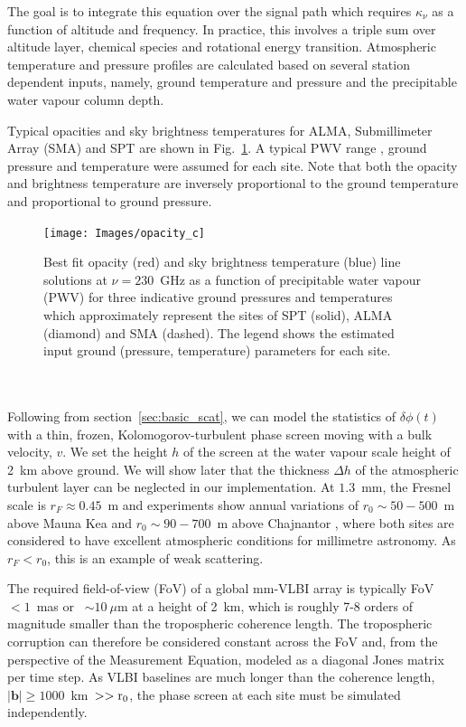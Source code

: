The goal is to integrate this equation over the signal path which requires $\kappa_\nu$ as a function of altitude and frequency. In practice, this involves a triple sum over altitude layer, chemical species and rotational energy transition. Atmospheric temperature and pressure profiles are calculated based on several station dependent inputs, namely, ground temperature and pressure and the precipitable water vapour column depth.

Typical opacities and sky brightness temperatures for ALMA, Submillimeter Array (SMA) and SPT  are shown in Fig.~\ref{fig:mean_atm}. A typical PWV range \cite{Lane_1998}, ground pressure and temperature were assumed for each site. Note that both the opacity and brightness temperature are inversely proportional to the ground temperature and proportional to ground pressure.

\begin{figure}
\begin{center}
\texttt{[image: Images/opacity\_c]}
\caption{Best fit opacity (red) and sky brightness temperature (blue) line solutions at $\nu =230$~GHz as a function of precipitable water vapour (PWV) for three indicative ground pressures and temperatures which approximately represent the sites of SPT (solid), ALMA (diamond) and SMA (dashed). The legend shows the estimated input ground (pressure, temperature) parameters for each site.\label{fig:mean_atm}%
}
\end{center}
\end{figure}
\\
~\\


Following from section~\ref{sec:basic_scat}, we can model the statistics of $\delta \phi(t)$ with a thin, frozen, Kolomogorov-turbulent phase screen moving with a bulk velocity, $v$.  We set the height $h$ of the screen at the water vapour scale height of 2~km above ground. We will show later that the thickness $\Delta h$ of the atmospheric turbulent layer can be neglected in our implementation. At $1.3$~mm, the Fresnel scale is $r_F \approx 0.45$~m and experiments show annual variations of $r_0 \sim 50 - 500$~m above Mauna Kea \citep{Masson_1994} and $r_0 \sim 90 - 700$~m above Chajnantor \citep*{Radford_1998}, where both sites are considered to have excellent atmospheric conditions for millimetre astronomy. As $r_F < r_0$, this is an example of weak scattering. 


The required field-of-view (FoV) of a global mm-VLBI array is typically FoV~$< 1$~mas or ~$\sim10~\mu$m at a height of 2~km, which is roughly 7-8 orders of magnitude smaller than the tropospheric coherence length. The tropospheric corruption can therefore be considered constant across the FoV and, from the perspective of the Measurement Equation, modeled as a diagonal Jones matrix per time step. As VLBI baselines are much longer than the coherence length, $|\mathbf{b}| \ge 1000$~km~$>> \rm r_0$, the phase screen at each site must be simulated independently.



